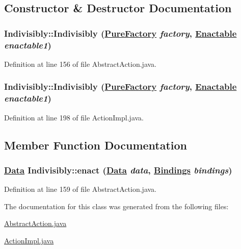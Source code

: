 \subsection{Constructor \& Destructor Documentation}
\hypertarget{classIndivisibly_a0}{
\subsubsection[Indivisibly]{\setlength{\rightskip}{0pt plus 5cm}Indivisibly::Indivisibly (\hyperlink{classPureFactory}{Pure\-Factory} {\em factory}, \hyperlink{interfaceEnactable}{Enactable} {\em enactable1})}}
\label{classIndivisibly_a0}




Definition at line 156 of file Abstract\-Action.java.\hypertarget{classIndivisibly_a2}{
\subsubsection[Indivisibly]{\setlength{\rightskip}{0pt plus 5cm}Indivisibly::Indivisibly (\hyperlink{classPureFactory}{Pure\-Factory} {\em factory}, \hyperlink{interfaceEnactable}{Enactable} {\em enactable1})}}
\label{classIndivisibly_a2}




Definition at line 198 of file Action\-Impl.java.

\subsection{Member Function Documentation}
\hypertarget{classIndivisibly_a1}{
\subsubsection[enact]{\setlength{\rightskip}{0pt plus 5cm}\hyperlink{interfaceData}{Data} Indivisibly::enact (\hyperlink{interfaceData}{Data} {\em data}, \hyperlink{interfaceBindings}{Bindings} {\em bindings})}}
\label{classIndivisibly_a1}




Definition at line 159 of file Abstract\-Action.java.

The documentation for this class was generated from the following files:\begin{CompactItemize}
\item 
\hyperlink{AbstractAction_8java-source}{Abstract\-Action.java}\item 
\hyperlink{ActionImpl_8java-source}{Action\-Impl.java}\end{CompactItemize}
